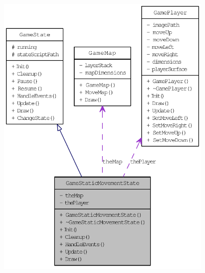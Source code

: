 \begin{figure}[H]
\begin{center}
\leavevmode
\includegraphics[height=400pt]{d3/d3d/class_game_static_movement_state__coll__graph}
\end{center}
\end{figure}
